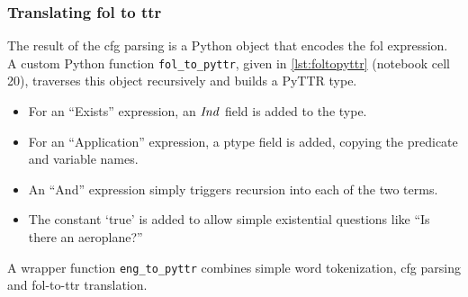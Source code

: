 \subsubsection{Translating \gls{fol} to \gls{ttr}}

The result of the \gls{cfg} parsing is a Python object that encodes the \gls{fol} expression.
A custom Python function \texttt{fol\_to\_pyttr}, given in \autoref{lst:foltopyttr} (notebook cell 20), traverses this object recursively and builds a PyTTR type.

\begin{itemize}
\item For an ``Exists'' expression, an $\mathit{Ind}$ field is added to the type.
\item For an ``Application'' expression, a ptype field is added, copying the predicate and variable names.
\item An ``And'' expression simply triggers recursion into each of the two terms.
\item The constant `true' is added to allow simple existential questions like ``Is there an aeroplane?''
\end{itemize}

A wrapper function \texttt{eng\_to\_pyttr} combines simple word tokenization, \gls{cfg} parsing and \gls{fol}-to-\gls{ttr} translation.

